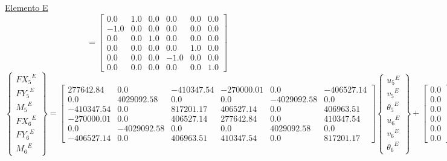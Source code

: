 \documentclass[a4paper]{article}
\begin{document}
\underline{Elemento E}
\\
{
\renewcommand{\arraystretch}{1.7}
\begin{equation}
[T^*_E]=
\left[\begin{matrix}0.0 & 1.0 & 0.0 & 0.0 & 0.0 & 0.0\\-1.0 & 0.0 & 0.0 & 0.0 & 0.0 & 0.0\\0.0 & 0.0 & 1.0 & 0.0 & 0.0 & 0.0\\0.0 & 0.0 & 0.0 & 0.0 & 1.0 & 0.0\\0.0 & 0.0 & 0.0 & -1.0 & 0.0 & 0.0\\0.0 & 0.0 & 0.0 & 0.0 & 0.0 & 1.0\end{matrix}\right]
\end{equation}
\begin{equation}
\left\{ \begin{array}{c}
{FX_5}^E \\ {FY_5}^E \\ {M_5}^E \\
{FX_6}^E  \\ {FY_6}^E \\ {M_6}^E 
\end{array} \right\} = 
\left[\begin{matrix}277642.84 & 0.0 & -410347.54 & -270000.01 & 0.0 & -406527.14\\0.0 & 4029092.58 & 0.0 & 0.0 & -4029092.58 & 0.0\\-410347.54 & 0.0 & 817201.17 & 406527.14 & 0.0 & 406963.51\\-270000.01 & 0.0 & 406527.14 & 277642.84 & 0.0 & 410347.54\\0.0 & -4029092.58 & 0.0 & 0.0 & 4029092.58 & 0.0\\-406527.14 & 0.0 & 406963.51 & 410347.54 & 0.0 & 817201.17\end{matrix}\right]
\left\{ \begin{array}{c}
{u_5}^E \\ {v_5}^E \\ {{\theta}_5}^E \\
{u_6}^E  \\ {v_6}^E \\ {{\theta}_6}^E 
\end{array} \right\}+
\left[\begin{matrix}0.0\\0.0\\0.0\\0.0\\0.0\\0.0\end{matrix}\right]
\end{equation}
}
\end{document}
